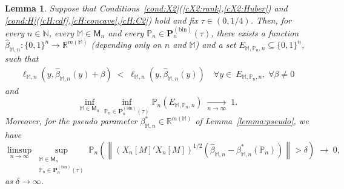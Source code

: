 \documentclass[preprint]{imsart}
\newcommand{\R}{{\mathbb R}}
\renewcommand{\P}{{\mathbb P}}
\newcommand{\N}{{\mathbb N}}
\newcommand{\M}{\mathbb M}
\newtheorem{lemma}[theorem]{Lemma}
\numberwithin{equation}{section}
\begin{document}
\begin{lemma}\label{lemma:unifCons}
Suppose that Conditions~\ref{cond:X2}(\ref{cX2:rank},\ref{cX2:Huber}) and \ref{cond:H}(\ref{cH:cdf},\ref{cH:concave},\ref{cH:C2}) hold and fix $\tau\in(0,1/4)$. Then, for every $n\in\N$, every $\M\in\mathsf{M}_n$ and every $\P_n\in\mathbf{P}_n^{(\mathrm{bin})}(\tau)$, there exists a function $\hat{\beta}_{\M,n}:\{0,1\}^n\to\R^{m(\M)}$ (depending only on $n$ and $\M$) and a set $E_{\M,\P_n,n}\subseteq \{0,1\}^n$, such that
\begin{align*}
\ell_{\M,n}\left(y, \hat{\beta}_{\M,n}(y) + \beta\right) \;<\; \ell_{\M,n}\left(y, \hat{\beta}_{\M,n}(y)\right) \quad \forall y\in\ E_{\M,\P_n,n},\;\forall \beta\neq 0
\end{align*}
and $$\inf_{\M\in\mathsf{M}_n}\inf_{\P_n\in\mathbf{P}_n^{(\mathrm{bin})}(\tau)} \P_n(E_{\M,\P_n,n}) \;\xrightarrow[n\to \infty]{} \; 1.$$
Moreover, for the pseudo parameter $\beta_{\M,n}^*\in\R^{m(\M)}$ of Lemma~\ref{lemma:pseudo}, we have
$$
\limsup_{n\to\infty}\sup_{\substack{\M\in\mathsf{M}_n\\\P_n\in\mathbf{P}_n^{(\mathrm{bin})}(\tau)}}
\P_n\left( 
	\left\| (X_n[M]'X_n[M])^{1/2}(\hat{\beta}_{\M,n} - \beta^*_{\M,n}(\P_n))\right\| > \delta\right)\; \to\; 0,
$$
as $\delta\to\infty$.
\end{lemma}
\end{document}
